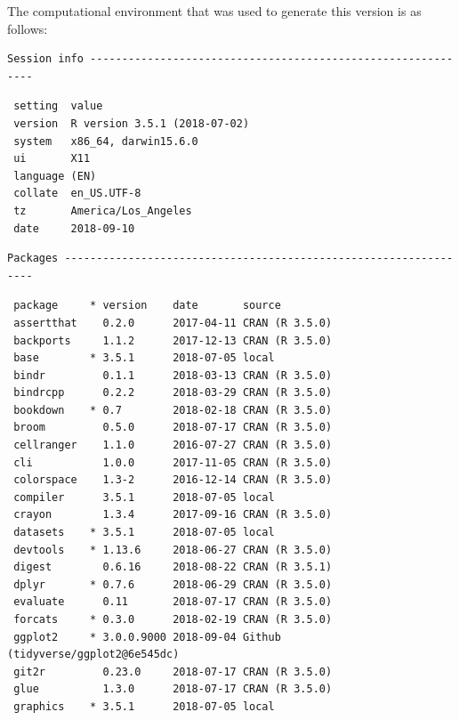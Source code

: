 \documentclass[twoside,12pt,final]{ucthesis-CA2012} %
\begin{document}
\begin{ucmainmatter}
The computational environment that was used to generate this version is
as follows:
\begin{verbatim}
Session info -------------------------------------------------------------
\end{verbatim}
\begin{verbatim}
 setting  value                       
 version  R version 3.5.1 (2018-07-02)
 system   x86_64, darwin15.6.0        
 ui       X11                         
 language (EN)                        
 collate  en_US.UTF-8                 
 tz       America/Los_Angeles         
 date     2018-09-10                  
\end{verbatim}
\begin{verbatim}
Packages -----------------------------------------------------------------
\end{verbatim}
\begin{verbatim}
 package     * version    date       source                               
 assertthat    0.2.0      2017-04-11 CRAN (R 3.5.0)                       
 backports     1.1.2      2017-12-13 CRAN (R 3.5.0)                       
 base        * 3.5.1      2018-07-05 local                                
 bindr         0.1.1      2018-03-13 CRAN (R 3.5.0)                       
 bindrcpp      0.2.2      2018-03-29 CRAN (R 3.5.0)                       
 bookdown    * 0.7        2018-02-18 CRAN (R 3.5.0)                       
 broom         0.5.0      2018-07-17 CRAN (R 3.5.0)                       
 cellranger    1.1.0      2016-07-27 CRAN (R 3.5.0)                       
 cli           1.0.0      2017-11-05 CRAN (R 3.5.0)                       
 colorspace    1.3-2      2016-12-14 CRAN (R 3.5.0)                       
 compiler      3.5.1      2018-07-05 local                                
 crayon        1.3.4      2017-09-16 CRAN (R 3.5.0)                       
 datasets    * 3.5.1      2018-07-05 local                                
 devtools    * 1.13.6     2018-06-27 CRAN (R 3.5.0)                       
 digest        0.6.16     2018-08-22 CRAN (R 3.5.1)                       
 dplyr       * 0.7.6      2018-06-29 CRAN (R 3.5.0)                       
 evaluate      0.11       2018-07-17 CRAN (R 3.5.0)                       
 forcats     * 0.3.0      2018-02-19 CRAN (R 3.5.0)                       
 ggplot2     * 3.0.0.9000 2018-09-04 Github (tidyverse/ggplot2@6e545dc)   
 git2r         0.23.0     2018-07-17 CRAN (R 3.5.0)                       
 glue          1.3.0      2018-07-17 CRAN (R 3.5.0)                       
 graphics    * 3.5.1      2018-07-05 local                                

\end{verbatim}
\end{ucmainmatter}
\end{document}
